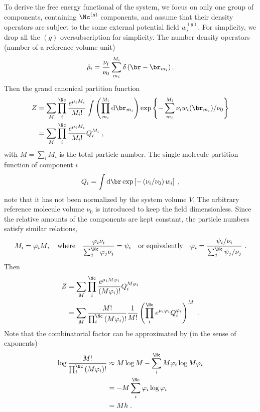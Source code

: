 \documentclass[aps,prl,reprint,onecolumn,groupedaddress,amsmath,amssymb]{revtex4-2}
\newcommand{\dd}{{\mathrm{d}}}
\begin{document}
To derive the free energy functional of the system, we focus on only one group of components, containing $\Nc^{(g)}$ components, and assume that their density operators are subject to the some external potential field $w_i^{(g)}$.
For simplicity, we drop all the $(g)$ oversubscription for simplicity.
The number density operators (number of a reference volume unit)
\begin{align}
    \hat{\rho}_i = \frac{\nu_i}{\nu_0} \sum_{m_i}^{M_i} \delta \left( \br - \br_{m_i} \right).
\end{align}
Then the grand canonical partition function
\begin{align}
    Z
     & = \sum_{M} \prod_i^{\Nc} \frac{e^{\mu_i M_i}}{M_i !} \int \left( \prod_{m_i}^{M_i} \dd \br_{m_i} \right) \exp \left\{ - \sum_{m_i}^{M_i} \nu_i w_i(\br_{m_i}) /\nu_0 \right\} \notag \\
     & = \sum_{M} \prod_i^{\Nc} \frac{e^{\mu_i M_i}}{M_i !} Q_i^{M_i} \;,
\end{align}
with $ M = \sum_i M_i$ is the total particle number.
The single molecule partition function of component $i$
\begin{align}
    Q_i = \int \dd \br \exp\left[-\left(\nu_i/\nu_0\right) w_i\right] \;,
\end{align}
note that it has not been normalized by the system volume $V$.
The arbitrary reference molecule volume $\nu_0$ is introduced to keep the field dimensionless.
Since the relative amounts of the components are kept constant, the particle numbers satisfy similar relations,
\begin{align}
    M_i = \varphi_i M,  \quad \mathrm{where} \quad \frac{\varphi_i \nu_i}{\sum_j^{\Nc} \varphi_j \nu_j} = \psi_i \quad \mathrm{or \; equivalently} \quad \varphi_i = \frac{\psi_i / \nu_i}{\sum_j^{\Nc} \psi_j / \nu_j} \;.
\end{align}
Then
\begin{align}
    Z
     & = \sum_{M} \prod_i^{\Nc} \frac{e^{\mu_i M \varphi_i}}{\left(M \varphi_i \right) !} Q_i^{M \varphi_i} \notag                                        \\
     & = \sum_{M} \frac{M!}{\prod_i^{\Nc}\left(M \varphi_i \right) !} \frac{1}{M!} \left( \prod_i^{\Nc} e^{\mu_i \varphi_i} Q_i^{\varphi_i} \right)^M \;.
\end{align}
Note that the combinatorial factor can be approximated by (in the sense of exponents)
\begin{align}
    \log \frac{M!}{\prod_i^{\Nc}\left(M \varphi_i \right) !}
     & \approx M \log M - \sum_i^{\Nc} M\varphi_i \log M\varphi_i \notag \\
     & = - M \sum_i^{\Nc} \varphi_i \log \varphi_i \notag                \\
     & = M h \;.
\end{align}
\end{document}
